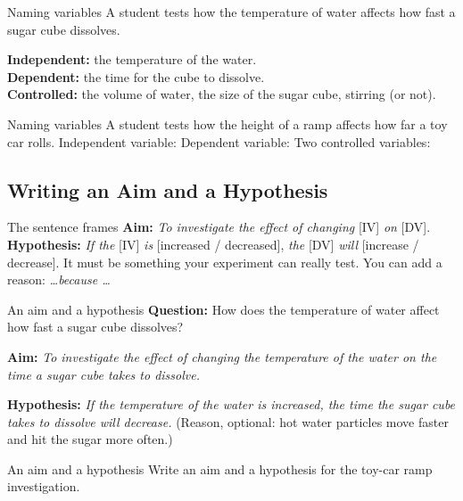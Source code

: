 \begin{workedex}{Naming variables}
A student tests how the temperature of water affects how fast a sugar cube dissolves.

\smallskip
\textbf{Independent:} the temperature of the water.\\
\textbf{Dependent:} the time for the cube to dissolve.\\
\textbf{Controlled:} the volume of water, the size of the sugar cube, stirring (or not).
\end{workedex}

\begin{wedo}{Naming variables}
A student tests how the height of a ramp affects how far a toy car rolls.
Independent variable:
\answerbox{1.2cm}
Dependent variable:
\answerbox{1.2cm}
Two controlled variables:
\answerbox{2.5cm}
\end{wedo}

\subsection{Writing an Aim and a Hypothesis}\label{sub:4.3}

\begin{skillbox}{The sentence frames}
\textbf{Aim:} \emph{To investigate the effect of changing} [IV] \emph{on} [DV].\\[2pt]
\textbf{Hypothesis:} \emph{If the} [IV] \emph{is} [increased / decreased], \emph{the} [DV] \emph{will} [increase / decrease]. It must be something your experiment can really test. You can add a reason: \emph{\dots because \dots}
\end{skillbox}

\begin{workedex}{An aim and a hypothesis}
\textbf{Question:} How does the temperature of water affect how fast a sugar cube dissolves?

\smallskip
\textbf{Aim:} \emph{To investigate the effect of changing the temperature of the water on the time a sugar cube takes to dissolve.}

\textbf{Hypothesis:} \emph{If the temperature of the water is increased, the time the sugar cube takes to dissolve will decrease.} (Reason, optional: hot water particles move faster and hit the sugar more often.)
\end{workedex}

\begin{wedo}{An aim and a hypothesis}
Write an aim and a hypothesis for the toy-car ramp investigation.
\answerbox{4.5cm}
\end{wedo}

